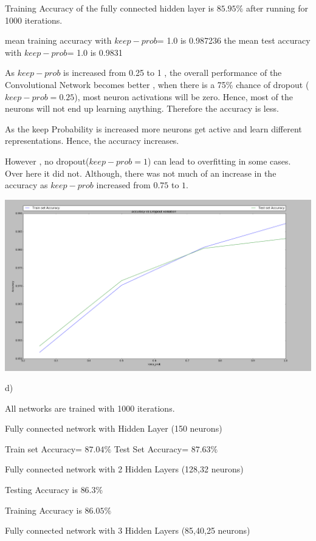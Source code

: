 \documentclass[]{article}
\begin{document}
Training Accuracy of the fully connected hidden layer is $85.95\%$ after running for 1000 iterations.
\bigskip


mean training accuracy with $keep - prob$= 1.0  is   0.987236
the mean test accuracy with $keep-prob$=  1.0  is  0.9831 

\bigskip


As $keep- prob$ is increased from 0.25 to 1 , the overall performance of the Convolutional Network becomes better , when there is a 75\% chance of dropout ($keep-prob=0.25$), most neuron activations will be zero. Hence, most of the neurons will not end up learning anything. Therefore the accuracy is less.

As the keep Probability is increased more neurons get active and learn different representations. Hence, the accuracy increases.

However , no dropout($keep-prob=1$) can lead to overfitting in some cases. Over here it did not. Although, there was not much of an increase in the accuracy as $keep-prob$ increased from $0.75$ to $1$.

\includegraphics[scale=0.25]{plt.png}


d)

All networks are trained with 1000 iterations.

Fully connected network with  Hidden Layer (150 neurons)

Train set Accuracy= $87.04\%$
Test Set Accuracy= $87.63\%$

Fully connected network with 2  Hidden Layers (128,32 neurons)

Testing Accuracy  is $86.3\%$ 

Training Accuracy  is $86.05\%$ 

Fully connected network with 3  Hidden Layers (85,40,25 neurons)
\end{document}
